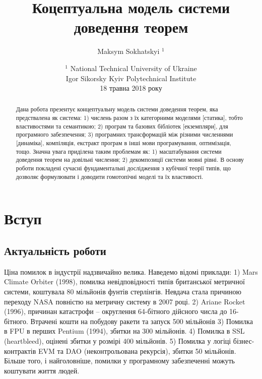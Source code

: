 \documentclass{article}
\begin{document}
\title{Коцептуальна модель системи доведення теорем}
\author{Maksym Sokhatskyi $^1$}
\date{ $^1$ National Technical University of Ukraine \\
       \small Igor Sikorsky Kyiv Polytechnical Institute\\
       \small 18 травна 2018 року }

\maketitle

\begin{abstract}
Дана робота презентує концептуальну модель системи доведення теорем, яка предствалена як система:
1) числень разом з їх категорними моделями [статика], тобто властивостями та семантикою;
2) програм та базових бібліотек [екземпляри], для програмного забезпечення;
3) програмних трансформацій між різними численнями [динаміка], компіляція, екстракт програм в інші мови програмування, оптимізація, тощо.
Значна увага приділена таким проблемам як: 1) масштабування системи доведення теорем
на довільні числення; 2) декомпозиції системи мовні рівні.
В основу роботи покладені сучасні фундаментальні дослідження з кубічної теорії типів,
що дозволяє формулювати і доводити гомотопічні моделі та їх властивості.
\end{abstract}

\newpage
\tableofcontents
\newpage

\section{Вступ}

\subsection{Актуальність роботи}

Ціна помилок в індустрії надзвичайно велика. Наведемо
відомі приклади: 1) Mars Climate Orbiter (1998), помилка невідповідності
типів британської метричної системи, коштувала 80 мільйонів фунтів стерлінгів.
Невдача стала причиною переходу NASA повністю на метричну систему в 2007 році.
2) Ariane Rocket (1996), причинан катастрофи -- округлення 64-бітного дійсного
числа до 16-бітного. Втрачені кошти на побудову ракети та запуск 500 мільйонів
3) Помилка в FPU в перших Pentium (1994), збитки на 300 мільйонів.
4) Помилка в SSL (heartbleed), оцінені збитки у розмірі 400 мільйонів.
5) Помилка у логіці бізнес-контрактів EVM та
DAO (неконтрольована рекурсія), збитки 50 мільйонів.
Більше того, і найголовніше, помилки у програмному забезпеченні можуть
коштувати життя людей.
\end{document}
